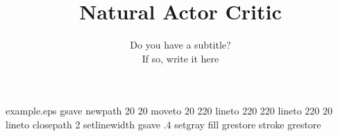 %
%
%
%
%
\begin{filecontents*}{example.eps}
gsave
newpath
  20 20 moveto
  20 220 lineto
  220 220 lineto
  220 20 lineto
closepath
2 setlinewidth
gsave
  .4 setgray fill
grestore
stroke
grestore
\end{filecontents*}
%
\RequirePackage{fix-cm}
%
\documentclass[smallextended]{svjour3}       %
%
\smartqed  %
%
\usepackage{graphicx}

%
%

\usepackage{natbib} %
\usepackage{amsmath}
\usepackage{algorithm}
\usepackage{algorithmic}


\newcommand{\x}{\item}


%
%

\title{Natural Actor Critic
}
\subtitle{Do you have a subtitle?\\ If so, write it here}

